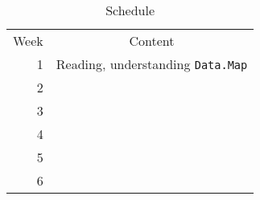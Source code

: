 \documentclass[a4paper,UKenglish,cleveref, autoref, thm-restate]{../template/lipics-v2021}
\begin{document}
\begin{table}[h!]
    \centering
    \begin{tabular}{ r | c }
        Week & Content \\
        1 & Reading, understanding \texttt{Data.Map} \\
        2 &  \\
        3 &  \\
        4 &  \\
        5 &  \\
        6 &  \\
    \end{tabular}
    \caption{Schedule}
    \label{tab:schedule}
\end{table}



\end{document}
